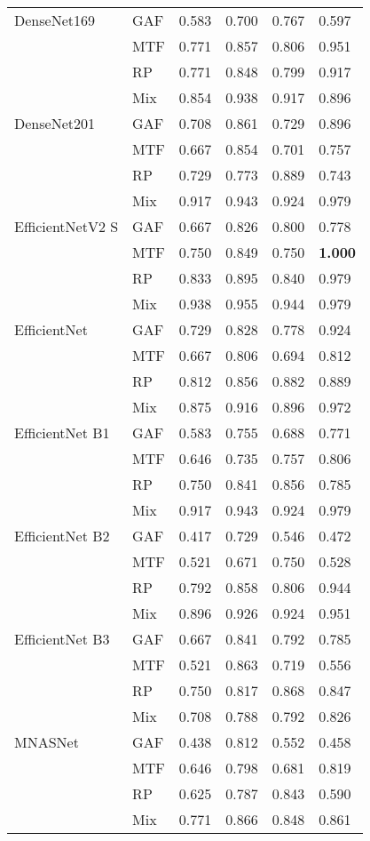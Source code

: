 \begin{tabular}[t]{llllll}
DenseNet169 & GAF & 0.583 & 0.700 & 0.767 & 0.597 \\
 & MTF & 0.771 & 0.857 & 0.806 & 0.951 \\
 & RP & 0.771 & 0.848 & 0.799 & 0.917 \\
 & Mix & 0.854 & 0.938 & 0.917 & 0.896 \\
DenseNet201 & GAF & 0.708 & 0.861 & 0.729 & 0.896 \\
 & MTF & 0.667 & 0.854 & 0.701 & 0.757 \\
 & RP & 0.729 & 0.773 & 0.889 & 0.743 \\
 & Mix & 0.917 & 0.943 & 0.924 & 0.979 \\
EfficientNetV2 S & GAF & 0.667 & 0.826 & 0.800 & 0.778 \\
 & MTF & 0.750 & 0.849 & 0.750 & \textbf{1.000} \\
 & RP & 0.833 & 0.895 & 0.840 & 0.979 \\
 & Mix & 0.938 & 0.955 & 0.944 & 0.979 \\
EfficientNet & GAF & 0.729 & 0.828 & 0.778 & 0.924 \\
 & MTF & 0.667 & 0.806 & 0.694 & 0.812 \\
 & RP & 0.812 & 0.856 & 0.882 & 0.889 \\
 & Mix & 0.875 & 0.916 & 0.896 & 0.972 \\
EfficientNet B1 & GAF & 0.583 & 0.755 & 0.688 & 0.771 \\
 & MTF & 0.646 & 0.735 & 0.757 & 0.806 \\
 & RP & 0.750 & 0.841 & 0.856 & 0.785 \\
 & Mix & 0.917 & 0.943 & 0.924 & 0.979 \\
EfficientNet B2 & GAF & 0.417 & 0.729 & 0.546 & 0.472 \\
 & MTF & 0.521 & 0.671 & 0.750 & 0.528 \\
 & RP & 0.792 & 0.858 & 0.806 & 0.944 \\
 & Mix & 0.896 & 0.926 & 0.924 & 0.951 \\
EfficientNet B3 & GAF & 0.667 & 0.841 & 0.792 & 0.785 \\
 & MTF & 0.521 & 0.863 & 0.719 & 0.556 \\
 & RP & 0.750 & 0.817 & 0.868 & 0.847 \\
 & Mix & 0.708 & 0.788 & 0.792 & 0.826 \\
MNASNet & GAF & 0.438 & 0.812 & 0.552 & 0.458 \\
 & MTF & 0.646 & 0.798 & 0.681 & 0.819 \\
 & RP & 0.625 & 0.787 & 0.843 & 0.590 \\
 & Mix & 0.771 & 0.866 & 0.848 & 0.861 \\
\bottomrule
\end{tabular}

